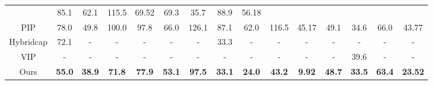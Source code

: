 \documentclass[sigconf,nonacm=true]{acmart}
\begin{document}
\begin{table*}[t]
{\begin{tabular}{c|ccc|ccc|cccc|cccc}
                                             & \multicolumn{1}{c}{85.1}      & \multicolumn{1}{c}{62.1}     & \multicolumn{1}{c}{115.5}         &69.52                     & \multicolumn{1}{c}{69.3}      & \multicolumn{1}{c}{35.7}            & \multicolumn{1}{c}{88.9}   &56.18   \\ 
PIP                                          & \multicolumn{1}{c}{78.0}       & \multicolumn{1}{c}{49.8}    & \multicolumn{1}{c|}{100.0}  & \multicolumn{1}{c}{97.8}       & \multicolumn{1}{c}{66.0}          & \multicolumn{1}{c|}{126.1}    
                                             & \multicolumn{1}{c}{87.1}      & \multicolumn{1}{c}{62.0}     & \multicolumn{1}{c}{116.5}         &45.17                     & \multicolumn{1}{c}{49.1}      & \multicolumn{1}{c}{34.6}            & \multicolumn{1}{c}{66.0}   &43.77   \\
Hybridcap                                    & \multicolumn{1}{c}{72.1}       & \multicolumn{1}{c}{-}       & \multicolumn{1}{c|}{-}      & \multicolumn{1}{c}{-}          & \multicolumn{1}{c}{-}             & \multicolumn{1}{c|}{-}    
                                             & \multicolumn{1}{c}{33.3}  & \multicolumn{1}{c}{-}         & \multicolumn{1}{c}{-}    & -                   & \multicolumn{1}{c}{-}         & \multicolumn{1}{c}{-}               & \multicolumn{1}{c}{-}      & -\\
VIP                                          & \multicolumn{1}{c}{-}       & \multicolumn{1}{c}{-}       & \multicolumn{1}{c|}{-}      & \multicolumn{1}{c}{-}          & \multicolumn{1}{c}{-}             & \multicolumn{1}{c|}{-}    
                                             & \multicolumn{1}{c}{-}  & \multicolumn{1}{c}{-}         & \multicolumn{1}{c}{-}    & -                   & \multicolumn{1}{c}{-}         & \multicolumn{1}{c}{39.6}               & \multicolumn{1}{c}{-}      & -\\ 
Ours                             & \multicolumn{1}{c}{\textbf{55.0}}& \multicolumn{1}{c}{\textbf{38.9}}& \multicolumn{1}{c|}{\textbf{71.8}} & \multicolumn{1}{c}{\textbf{77.9}}& \multicolumn{1}{c}{\textbf{53.1}}& \multicolumn{1}{c|}{\textbf{97.5}}         
                    & \multicolumn{1}{c}{\textbf{33.1}}& \multicolumn{1}{c}{\textbf{24.0}}& \multicolumn{1}{c}{\textbf{43.2}}   & \textbf{9.92}       & \multicolumn{1}{c}{\textbf{48.7}}& \multicolumn{1}{c}{\textbf{33.5}} & \multicolumn{1}{c}{\textbf{63.4}}     & \textbf{23.52} \\
\hline
\end{tabular}}
\end{table*}
\end{document}
